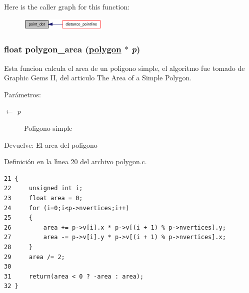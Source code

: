 Here is the caller graph for this function:\begin{figure}[H]
\begin{center}
\leavevmode
\includegraphics[width=117pt]{group__geometry_ga7ae8d919209fea43e8a61215398bbbe_ga7ae8d919209fea43e8a61215398bbbe_icgraph}
\end{center}
\end{figure}
\hypertarget{group__geometry_gcfbc9e7772d80361768bc0b65cebbca1_gcfbc9e7772d80361768bc0b65cebbca1}{
\subsubsection[polygon\_\-area]{\setlength{\rightskip}{0pt plus 5cm}float polygon\_\-area (\hyperlink{struct__polygon}{polygon} $\ast$ {\em p})}}
\label{group__geometry_gcfbc9e7772d80361768bc0b65cebbca1_gcfbc9e7772d80361768bc0b65cebbca1}


Esta funcion calcula el area de un poligono simple, el algoritmo fue tomado de Graphic Gems II, del articulo The Area of a Simple Polygon.

\begin{Desc}
\item[Par\'{a}metros:]
\begin{description}
\item[\mbox{$\leftarrow$} {\em p}]Poligono simple \end{description}
\end{Desc}
\begin{Desc}
\item[Devuelve:]El area del poligono \end{Desc}


Definici\'{o}n en la l\'{\i}nea 20 del archivo polygon.c.

\begin{Code}\begin{verbatim}21 {
22     unsigned int i;
23     float area = 0;
24     for (i=0;i<p->nvertices;i++)
25     {
26         area += p->v[i].x * p->v[(i + 1) % p->nvertices].y;
27         area -= p->v[i].y * p->v[(i + 1) % p->nvertices].x;
28     }
29     area /= 2;
30 
31     return(area < 0 ? -area : area);
32 }
\end{verbatim}\end{Code}




